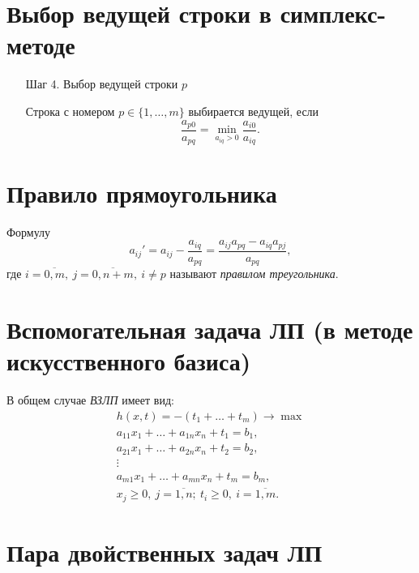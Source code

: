 \section{Выбор ведущей строки в симплекс-методе}

\begin{enumerate}
	\item[Шаг 4.] Выбор ведущей строки $p$

	      Строка с номером $p \in \{1,\ldots,m\}$ выбирается ведущей, если
	      \[
		      \frac{a_{p0}}{a_{pq}} = \underset{a_{iq} > 0}{\min}\frac{a_{i0}}{a_{iq}}.
	      \]
\end{enumerate}

\section{Правило прямоугольника}

\begin{definition}
	Формулу
	\[
		a_{ij}' = a_{ij} - \frac{a_{iq}}{a_{pq}} = \frac{a_{ij}a_{pq} - a_{iq}a_{pj}}{a_{pq}},
	\]
	где $i = \overline{0,m}, \ j = \overline{0,n+m}, \ i\ne p$ называют \emph{правилом треугольника}.
\end{definition}

\section{Вспомогательная задача ЛП (в методе искусственного базиса)}

\begin{definition}
	В общем случае \emph{ВЗЛП} имеет вид:
	\[
		\begin{array}{l}
			h(x,t) = -(t_1 + \ldots + t_m) \rightarrow \max \\
			a_{11}x_1 + \ldots + a_{1n}x_n + t_1 = b_1,     \\
			a_{21}x_1 + \ldots + a_{2n}x_n + t_2 = b_2,     \\
			\vdots                                          \\
			a_{m1}x_1 + \ldots + a_{mn}x_n + t_m = b_m,     \\
			x_j \geqslant 0, \ j = \overline{1,n}; \ t_i \geqslant 0, \ i = \overline{1,m}.
		\end{array}
	\]
\end{definition}

\section{Пара двойственных задач ЛП}

